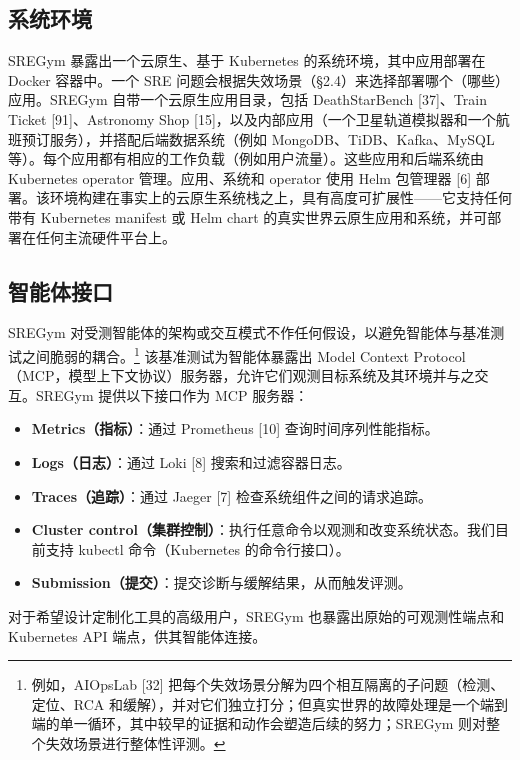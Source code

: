 \documentclass[11pt,UTF8,fontset=fandol]{ctexart}
\begin{document}
\subsection{系统环境}

SREGym 暴露出一个云原生、基于 Kubernetes 的系统环境，其中应用部署在 Docker 容器中。一个 SRE 问题会根据失效场景（§2.4）来选择部署哪个（哪些）应用。SREGym 自带一个云原生应用目录，包括 DeathStarBench [37]、Train Ticket [91]、Astronomy Shop [15]，以及内部应用（一个卫星轨道模拟器和一个航班预订服务），并搭配后端数据系统（例如 MongoDB、TiDB、Kafka、MySQL 等）。每个应用都有相应的工作负载（例如用户流量）。这些应用和后端系统由 Kubernetes operator 管理。应用、系统和 operator 使用 Helm 包管理器 [6] 部署。该环境构建在事实上的云原生系统栈之上，具有高度可扩展性——它支持任何带有 Kubernetes manifest 或 Helm chart 的真实世界云原生应用和系统，并可部署在任何主流硬件平台上。

\subsection{智能体接口}

SREGym 对受测智能体的架构或交互模式不作任何假设，以避免智能体与基准测试之间脆弱的耦合。\footnote{例如，AIOpsLab [32] 把每个失效场景分解为四个相互隔离的子问题（检测、定位、RCA 和缓解），并对它们独立打分；但真实世界的故障处理是一个端到端的单一循环，其中较早的证据和动作会塑造后续的努力；SREGym 则对整个失效场景进行整体性评测。} 该基准测试为智能体暴露出 Model Context Protocol（MCP，模型上下文协议）服务器，允许它们观测目标系统及其环境并与之交互。SREGym 提供以下接口作为 MCP 服务器：

\begin{itemize}[leftmargin=1.5em]
\item \textbf{Metrics（指标）}：通过 Prometheus [10] 查询时间序列性能指标。
\item \textbf{Logs（日志）}：通过 Loki [8] 搜索和过滤容器日志。
\item \textbf{Traces（追踪）}：通过 Jaeger [7] 检查系统组件之间的请求追踪。
\item \textbf{Cluster control（集群控制）}：执行任意命令以观测和改变系统状态。我们目前支持 kubectl 命令（Kubernetes 的命令行接口）。
\item \textbf{Submission（提交）}：提交诊断与缓解结果，从而触发评测。
\end{itemize}

对于希望设计定制化工具的高级用户，SREGym 也暴露出原始的可观测性端点和 Kubernetes API 端点，供其智能体连接。
\end{document}
